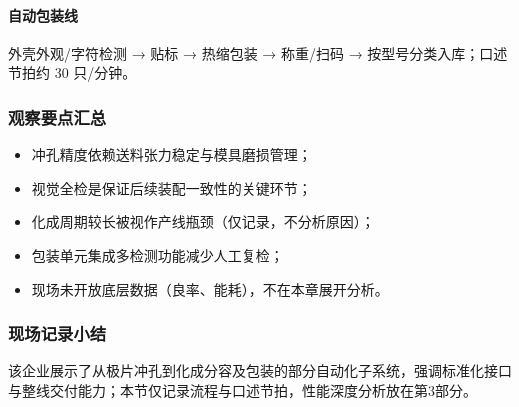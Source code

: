 \paragraph{自动包装线} 外壳外观/字符检测 → 贴标 → 热缩包装 → 称重/扫码 → 按型号分类入库；口述节拍约 30 只/分钟。

\subsubsection{观察要点汇总}
\begin{itemize}
  \item 冲孔精度依赖送料张力稳定与模具磨损管理；
  \item 视觉全检是保证后续装配一致性的关键环节；
  \item 化成周期较长被视作产线瓶颈（仅记录，不分析原因）；
  \item 包装单元集成多检测功能减少人工复检；
  \item 现场未开放底层数据（良率、能耗），不在本章展开分析。
\end{itemize}

\subsubsection{现场记录小结}
该企业展示了从极片冲孔到化成分容及包装的部分自动化子系统，强调标准化接口与整线交付能力；本节仅记录流程与口述节拍，性能深度分析放在第3部分。


